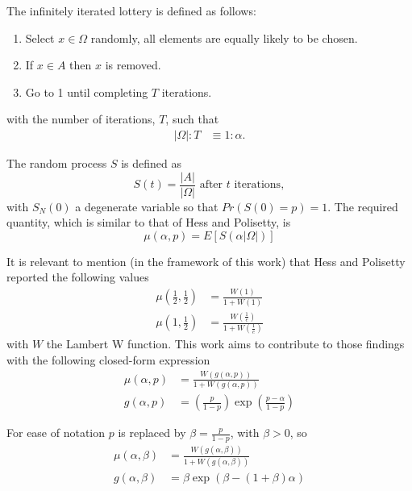 \documentclass{article}
\newcommand{\card}[1]{\left| #1 \right|}
\newcommand{\ppar}[1]{\left( #1 \right)}
\begin{document}
The infinitely iterated lottery is defined as follows:
\begin{enumerate}
    \item Select $x\in \Omega$ randomly, all elements are equally likely to be chosen.
    \item If $x\in A$ then $x$ is removed.
    \item Go to 1 until completing $T$ iterations.
\end{enumerate}
with the number of iterations, $T$, such that
\begin{align}
    \card{\Omega} : T &\equiv 1:\alpha.
\end{align}

The random process $S$ is defined as
\begin{equation}
    S(t) = \frac{\card{A}}{\card{\Omega}} \text{ after } t \text{ iterations},
\end{equation}
with $S_N(0)$ a degenerate variable so that $Pr\left(S(0) =  p\right)=1$. The required quantity, which is similar to that of Hess and Polisetty, is 
\begin{equation}
    \mu(\alpha, p) = E\left[ S\left( \alpha \card{\Omega} \right) \right]
\end{equation}

It is relevant to mention (in the framework of this work) that  Hess and Polisetty reported the following values
\begin{align}
    \mu\ppar{\frac{1}{2}, \frac{1}{2}}
    &=
    \frac{W\ppar{1}}{1+W\ppar{1}} \\
    \mu\ppar{1, \frac{1}{2}}
    &=
    \frac{W\ppar{\frac{1}{e}}}{1+W\ppar{\frac{1}{e}}} 
\end{align}
with $W$ the Lambert W function. This work aims to contribute to those findings with the following closed-form expression
\begin{align}
    \mu\ppar{\alpha, p} &= \frac{W\ppar{g\ppar{\alpha, p}}}{1+W\ppar{g\ppar{\alpha, p}}}
    \\
    g\ppar{\alpha, p} &=
    \ppar{\frac{p}{1-p}} \exp{\ppar{\frac{p-\alpha}{1-p}}}
\end{align}

For ease of notation $p$ is replaced by $\beta = \frac{p}{1-p}$, with $\beta>0$, so
\begin{align}
    \mu\ppar{\alpha, \beta} &= \frac{W\ppar{g\ppar{\alpha, \beta}}}{1+W\ppar{g\ppar{\alpha, \beta}}}
    \\
    g\ppar{\alpha, \beta} &=
    \beta \exp{\ppar{\beta - (1+\beta)\alpha}}
\end{align}
\end{document}

